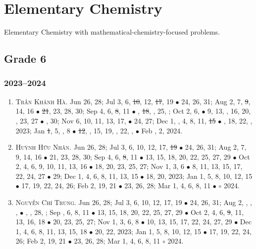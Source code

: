 \documentclass{article}
\begin{document}

\section{Elementary Chemistry}
Elementary Chemistry with mathematical-chemistry-focused problems.

\subsection{Grade 6}

\subsubsection{2023--2024}

\begin{enumerate}
	\item \textsc{Trần Khánh Hà.} {\sf[In]} Jun 26, 28; Jul 3, 6, \st{10}, 12, \st{17}, 19 $\bullet$ 24, 26, 31; Aug 2, 7, \st{9}, 14, 16 $\bullet$ \st{21}, 23, 28, 30; Sep 4, 6, \st{8}, 11 $\bullet$ , \st{18}, , 25, ; Oct 2, 6,   $\bullet$ 9, 13, , 16, 20, , 23, 27 $\bullet$ , 30; Nov 6, 10, 11, 13, 17,  $\bullet$ 24, 27; Dec 1, , 4, 8, 11, \st{15} $\bullet$ , 18, 22, , 2023; Jan \st{1}, 5, , 8  $\bullet$ \st{12}, , 15, 19, , 22, ,  $\bullet$ Feb , 2, 2024.
	\item \textsc{Huỳnh Hữu Nhân.} {\sf[In]} Jun 26, 28; Jul 3, 6, 10, 12, 17, \st{19} $\bullet$ 24, 26, 31; Aug 2, 7, 9, 14, 16 $\bullet$ 21, 23, 28, 30; Sep 4, 6, \st{8}, 11 $\bullet$ 13, 15, 18, 20, 22, 25, 27, 29 $\bullet$ Oct 2, 4, 6, 9, 10, 11, 13, 16 $\bullet$ 18, 20, 23, 25, 27; Nov 1, 3, 6 $\bullet$ 8, 11, 13, 15, 17, 22, 24, 27 $\bullet$ 29; Dec 1, 4, 6, 8, 11, 13, 15 $\bullet$ 18, 20, 2023; Jan 1, 5, 8, 10, 12, 15 $\bullet$ 17, 19, 22, 24, 26; Feb 2, 19, 21 $\bullet$ 23, 26, 28; Mar 1, 4, 6, 8, 11 $\bullet$ $\circ$ 2024.
	\item \textsc{Nguyễn Chí Trung.} {\sf[In]} Jun 26, 28; Jul 3, 6, 10, 12, 17, 19 $\bullet$ 24, 26, 31; Aug 2, , , ,  $\bullet$ , , 28, ; Sep , 6, 8, 11 $\bullet$ 13, 15, 18, 20, 22, 25, 27, 29 $\bullet$ Oct 2, 4, 6, \st{9}, 11, 13, 16, 18 $\bullet$ 20, 23, 25, 27; Nov 1, 3, 6, 8 $\bullet$ 10, 13, 15, 17, 22, 24, 27, 29 $\bullet$ Dec 1, 4, 6, 8, 11, 13, 15, 18 $\bullet$ 20, 22, 2023; Jan 1, 5, 8, 10, 12, 15 $\bullet$ 17, 19, 22, 24, 26; Feb 2, 19, 21 $\bullet$ 23, 26, 28; Mar 1, 4, 6, 8, 11 $\circ$ 2024.
\end{enumerate}
\end{document}
